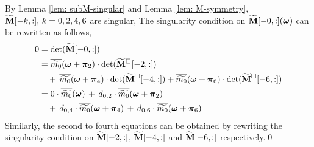 By Lemma \ref{lem: subM-singular} and Lemma \ref{lem: M-symmetry},  $\M[-k,:],\,k=0,2,4,6$ are singular,
The singularity condition on  $\M[-0,:](\V{\omega})$ can be rewritten as follows,
\begin{align}\label{eq: singular-omega}
0 &=\det(\M[-0,:]) \notag\\
&=  \sbarmp{0}{2}\cdot\det(\Msub[-2,:])\notag\\
&\quad+ \,\sbarmp{0}{4}\cdot\det(\Msub[-4,:])
+ \sbarmp{0}{6}\cdot\det(\Msub[-6,:])\notag\\
&= 0\cdot\sbarm{0}\,+\,d_{0,2}\cdot\sbarmp{0}{2} \notag\\
&\quad+\,d_{0,4}\cdot \sbarmp{0}{4}\,+\, d_{0,6}\cdot\sbarmp{0}{6}
\end{align}
Similarly, the second to fourth equations can be obtained by rewriting the singularity condition on $\M[-2,:]$, $\M[-4,:]$ and $\M[-6,:]$ respectively.\qed


